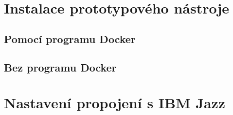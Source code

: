\documentclass[czech,master,public,dept460,male,cpdeclaration,oneside]{diploma}
\begin{document}
\section{Instalace prototypového nástroje}
\subsection{Pomocí programu Docker}

\subsection{Bez programu Docker}

\section{Nastavení propojení s IBM Jazz}
\end{document}
